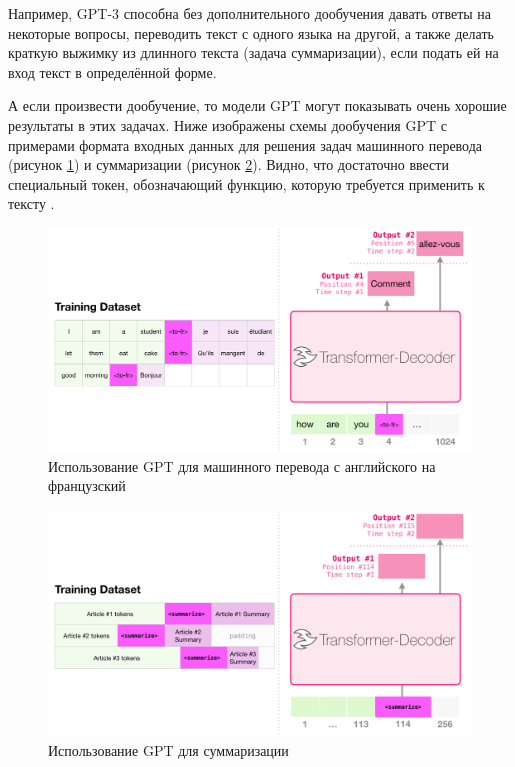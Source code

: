 Например, GPT-3 способна без дополнительного дообучения давать ответы на некоторые вопросы, переводить текст с одного языка на другой, а также делать краткую выжимку из длинного текста (задача суммаризации), если подать ей на вход текст в определённой форме.

А если произвести дообучение, то модели GPT могут показывать очень хорошие результаты в этих задачах. Ниже изображены схемы дообучения GPT с примерами формата входных данных для решения задач машинного перевода (рисунок \ref*{fig:gpt_translation}) и суммаризации (рисунок \ref*{fig:gpt_summarization}). Видно, что достаточно ввести специальный токен, обозначающий функцию, которую требуется применить к тексту \cite{art:gpt3}.

\begin{figure}[h]
    \centering
    \includegraphics[width=\textwidth]{../inc/images/gpt-translation.png}
    \caption{Использование GPT для машинного перевода с английского на французский}
    \label{fig:gpt_translation}
\end{figure}

\begin{figure}[h]
    \centering
    \includegraphics[width=\textwidth]{../inc/images/gpt-summarization.png}
    \caption{Использование GPT для суммаризации}
    \label{fig:gpt_summarization}
\end{figure}
